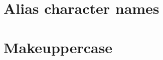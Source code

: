 \documentclass{article}
\begin{document}
\subsubsection{\GreekExtendedVIII}
\subsubsection{\GreekExtendedIX}
\subsubsection{\GreekExtendedX}
\subsubsection{\GreekExtendedXI}
\subsubsection{\GreekExtendedXII}
\subsubsection{\GreekExtendedXIII}
\subsubsection{\GreekExtendedXIV}
\subsubsection{\GreekExtendedXV}
\subsubsection{\GreekExtendedXVI}


\section{Alias character names}

\subsection{\ensuregreek{
  \textvarTheta
  \textvarepsilon
  \textvarphi
  \textvarsigma
  \textvarbeta
  \textvartheta
  \textvarpi
  \textvarkappa
  \textvarrho
  \textnumeralsigngreek
  \textnumeralsignlowergreek
  \textmugreek
  \textStigmagreek
  \textDigammagreek
  \textdigammagreek
  \textSampigreek
  \textsampigreek
}}


\section{Makeuppercase}
\end{document}
